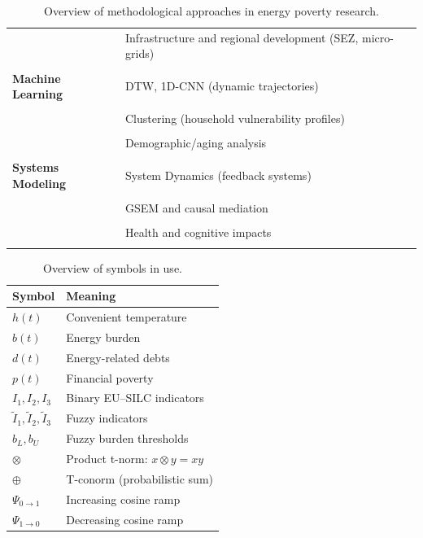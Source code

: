 \documentclass[11pt,a4paper]{article}
\begin{document}
\begin{table}[h!]
\begin{tabular}{p{3.3cm} p{8.5cm}}
& Infrastructure and regional development (SEZ, micro-grids) \\
& \cite{GONG2026115104, kone2023sez} \\

\midrule

\textbf{Machine Learning} 
& DTW, 1D-CNN (dynamic trajectories) \\
& \cite{BUDRIA2026104670} \\

& Clustering (household vulnerability profiles) \\
& \cite{CRETI2026109209, kaur2021timepoverty, njoku2022gendered} \\

& Demographic/aging analysis \\
& \cite{taylor2020pension, muller2021elderly, li2022transitioning} \\

\midrule

\textbf{Systems Modeling} 
& System Dynamics (feedback systems) \\
& \cite{ZARGHAMI2026127902} \\

& GSEM and causal mediation \\
& \cite{ULLAH2026115185, ADABOR2026115293} \\

& Health and cognitive impacts \\
& \cite{chen2023aging, lee2023cognitive} \\

\bottomrule
\end{tabular}
\caption{Overview of methodological approaches in energy poverty research.}
\label{tab:methods}
\end{table}

\begin{table}[h!]
\centering
\begin{tabular}{ll}
\toprule
Symbol & Meaning \\
\midrule
$h(t)$ &  Convenient temperature \\
$b(t)$ & Energy burden \\
$d(t)$ & Energy-related debts \\
$p(t)$ & Financial poverty \\
\midrule
$I_1,I_2,I_3$ & Binary EU--SILC indicators \\
$\tilde I_1,\tilde I_2,\tilde I_3$ & Fuzzy indicators \\
$b_L,b_U$ & Fuzzy burden thresholds \\
\midrule
$\otimes$ & Product t-norm: $x\otimes y = xy$ \\
$\oplus$ & T-conorm (probabilistic sum) \\
$\Psi_{0\to 1}$ & Increasing cosine ramp \\
$\Psi_{1\to 0}$ & Decreasing cosine ramp \\
\bottomrule
\end{tabular}
\caption{Overview of symbols in use.}\label{tab:symbols}
\end{table}
\end{document}
